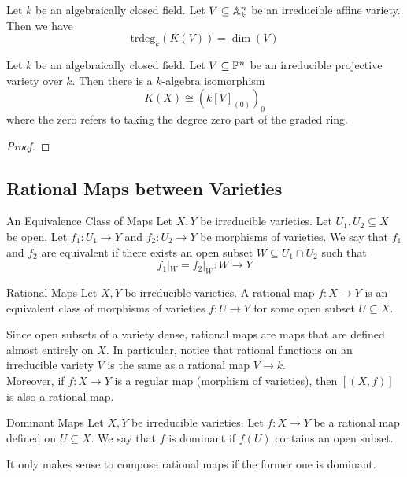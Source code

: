 \documentclass[a4paper]{article}
\begin{document}
\begin{prp}{}{} Let $k$ be an algebraically closed field. Let $V\subseteq\mathbb{A}_k^n$ be an irreducible affine variety. Then we have $$\text{trdeg}_k(K(V))=\dim(V)$$
\end{prp}

\begin{prp}{}{} Let $k$ be an algebraically closed field. Let $V\subseteq\mathbb{P}^n$ be an irreducible projective variety over $k$. Then there is a $k$-algebra isomorphism $$K(X)\cong(k[V]_{(0)})_0$$ where the zero refers to taking the degree zero part of the graded ring. \tcbline
\begin{proof}
\end{proof}
\end{prp}

\subsection{Rational Maps between Varieties}
\begin{defn}{An Equivalence Class of Maps}{} Let $X,Y$ be irreducible varieties. Let $U_1,U_2\subseteq X$ be open. Let $f_1:U_1\to Y$ and $f_2:U_2\to Y$ be morphisms of varieties. We say that $f_1$ and $f_2$ are equivalent if there exists an open subset $W\subseteq U_1\cap U_2$ such that $$f_1|_W=f_2|_W:W\to Y$$
\end{defn}

\begin{defn}{Rational Maps}{} Let $X,Y$ be irreducible varieties. A rational map $f:X\to Y$ is an equivalent class of morphisms of varieties $f:U\to Y$ for some open subset $U\subseteq X$. 
\end{defn}

Since open subsets of a variety dense, rational maps are maps that are defined almost entirely on $X$. In particular, notice that rational functions on an irreducible variety $V$ is the same as a rational map $V\to k$. \\

Moreover, if $f:X\to Y$ is a regular map (morphism of varieties), then $[(X,f)]$ is also a rational map. 

\begin{defn}{Dominant Maps}{} Let $X,Y$ be irreducible varieties. Let $f:X\to Y$ be a rational map defined on $U\subseteq X$. We say that $f$ is dominant if $f(U)$ contains an open subset. 
\end{defn}

It only makes sense to compose rational maps if the former one is dominant. 
\end{document}

